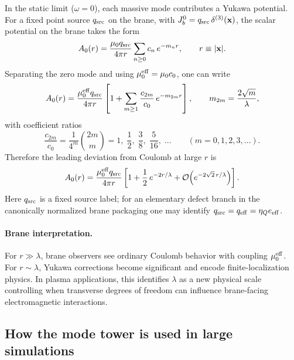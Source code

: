 \documentclass[11pt]{article}
\begin{document}
In the static limit (\(\omega=0\)), each massive mode contributes a Yukawa potential.
For a fixed point source \(q_{\rm src}\) on the brane, with
\(J_b^0=q_{\rm src}\,\delta^{(3)}(\mathbf{x})\),
the scalar potential on the brane takes the form
\begin{equation}
A_0(r)
=
\frac{\mu_0 q_{\rm src}}{4\pi r}\sum_{n\ge 0}c_n\,e^{-m_n r},
\qquad r\equiv|\mathbf{x}|.
\label{eq:A0_KK_sum_app}
\end{equation}
Separating the zero mode and using \(\mu_0^{\rm eff}=\mu_0 c_0\), one can write
\begin{equation}
A_0(r)
=
\frac{\mu_0^{\rm eff} q_{\rm src}}{4\pi r}
\left[
1+\sum_{m\ge 1}\frac{c_{2m}}{c_0}\,e^{-m_{2m}r}
\right],
\qquad
m_{2m}=\frac{2\sqrt{m}}{\lambda},
\label{eq:A0_mu_eff_form_app}
\end{equation}
with coefficient ratios
\begin{equation}
\frac{c_{2m}}{c_0}
=
\frac{1}{4^m}\binom{2m}{m}
= 1,\;\frac12,\;\frac{3}{8},\;\frac{5}{16},\;\ldots
\qquad (m=0,1,2,3,\ldots).
\label{eq:cn_ratio_app}
\end{equation}
Therefore the leading deviation from Coulomb at large \(r\) is
\begin{equation}
A_0(r)
=
\frac{\mu_0^{\rm eff} q_{\rm src}}{4\pi r}
\left[
1+\frac12\,e^{-2r/\lambda}
+\mathcal{O}\!\left(e^{-2\sqrt{2}\,r/\lambda}\right)
\right].
\label{eq:leading_yukawa_em}
\end{equation}
Here \(q_{\rm src}\) is a fixed source label; for an elementary defect branch in the
canonically normalized brane packaging one may identify
\(q_{\rm src}=q_{\rm eff}=\eta_Q e_{\rm eff}\).

\paragraph{Brane interpretation.}
For \(r\gg \lambda\), brane observers see ordinary Coulomb behavior with coupling
\(\mu_0^{\rm eff}\). For \(r\sim \lambda\), Yukawa corrections become significant and
encode finite-localization physics. In plasma applications, this identifies \(\lambda\)
as a new physical scale controlling when transverse degrees of freedom can influence
brane-facing electromagnetic interactions.

\subsection{How the mode tower is used in large simulations}
\label{app:mode_tower_in_computation}
\end{document}
